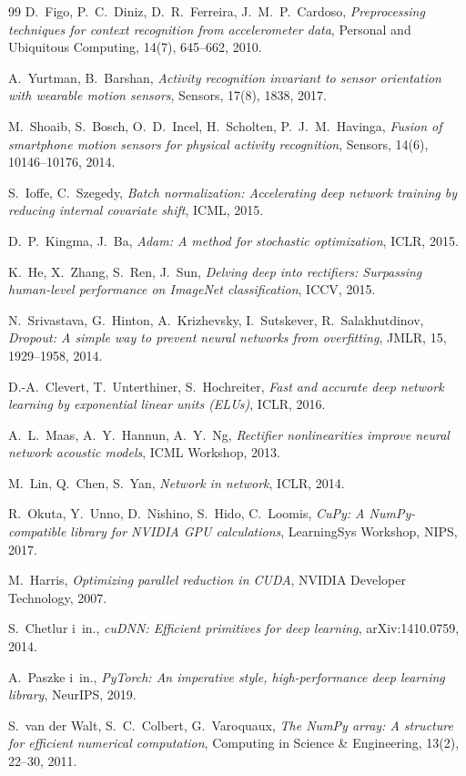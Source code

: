 \documentclass[12pt,a4paper]{article}
\begin{document}
\begin{thebibliography}{99}
D.~Figo, P.~C.~Diniz, D.~R.~Ferreira, J.~M.~P.~Cardoso,
\textit{Preprocessing techniques for context recognition from accelerometer data},
Personal and Ubiquitous Computing, 14(7), 645--662, 2010.

A.~Yurtman, B.~Barshan,
\textit{Activity recognition invariant to sensor orientation with wearable motion sensors},
Sensors, 17(8), 1838, 2017.

M.~Shoaib, S.~Bosch, O.~D.~Incel, H.~Scholten, P.~J.~M.~Havinga,
\textit{Fusion of smartphone motion sensors for physical activity recognition},
Sensors, 14(6), 10146--10176, 2014.

S.~Ioffe, C.~Szegedy,
\textit{Batch normalization: Accelerating deep network training by reducing internal covariate shift},
ICML, 2015.

D.~P.~Kingma, J.~Ba,
\textit{Adam: A method for stochastic optimization},
ICLR, 2015.

K.~He, X.~Zhang, S.~Ren, J.~Sun,
\textit{Delving deep into rectifiers: Surpassing human-level performance on ImageNet classification},
ICCV, 2015.

N.~Srivastava, G.~Hinton, A.~Krizhevsky, I.~Sutskever, R.~Salakhutdinov,
\textit{Dropout: A simple way to prevent neural networks from overfitting},
JMLR, 15, 1929--1958, 2014.

D.-A.~Clevert, T.~Unterthiner, S.~Hochreiter,
\textit{Fast and accurate deep network learning by exponential linear units (ELUs)},
ICLR, 2016.

A.~L.~Maas, A.~Y.~Hannun, A.~Y.~Ng,
\textit{Rectifier nonlinearities improve neural network acoustic models},
ICML Workshop, 2013.

M.~Lin, Q.~Chen, S.~Yan,
\textit{Network in network},
ICLR, 2014.

R.~Okuta, Y.~Unno, D.~Nishino, S.~Hido, C.~Loomis,
\textit{CuPy: A NumPy-compatible library for NVIDIA GPU calculations},
LearningSys Workshop, NIPS, 2017.

M.~Harris,
\textit{Optimizing parallel reduction in CUDA},
NVIDIA Developer Technology, 2007.

S.~Chetlur i~in.,
\textit{cuDNN: Efficient primitives for deep learning},
arXiv:1410.0759, 2014.

A.~Paszke i~in.,
\textit{PyTorch: An imperative style, high-performance deep learning library},
NeurIPS, 2019.

S.~van der Walt, S.~C.~Colbert, G.~Varoquaux,
\textit{The NumPy array: A structure for efficient numerical computation},
Computing in Science \& Engineering, 13(2), 22--30, 2011.

\end{thebibliography}
\end{document}
